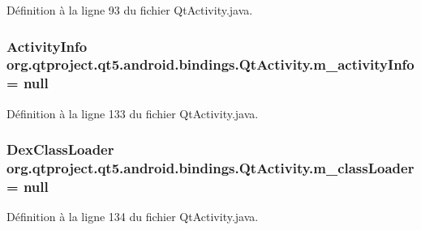 Définition à la ligne 93 du fichier Qt\-Activity.\-java.

\hypertarget{classorg_1_1qtproject_1_1qt5_1_1android_1_1bindings_1_1_qt_activity_ab82e3c0917844afbd0559863f78137bf}{
\subsubsection[{m\-\_\-activity\-Info}]{\setlength{\rightskip}{0pt plus 5cm}Activity\-Info org.\-qtproject.\-qt5.\-android.\-bindings.\-Qt\-Activity.\-m\-\_\-activity\-Info = null\hspace{0.3cm}{\ttfamily [private]}}}\label{classorg_1_1qtproject_1_1qt5_1_1android_1_1bindings_1_1_qt_activity_ab82e3c0917844afbd0559863f78137bf}


Définition à la ligne 133 du fichier Qt\-Activity.\-java.

\hypertarget{classorg_1_1qtproject_1_1qt5_1_1android_1_1bindings_1_1_qt_activity_a061ee56178d4d7ab6da01d7cf187e33b}{
\subsubsection[{m\-\_\-class\-Loader}]{\setlength{\rightskip}{0pt plus 5cm}Dex\-Class\-Loader org.\-qtproject.\-qt5.\-android.\-bindings.\-Qt\-Activity.\-m\-\_\-class\-Loader = null\hspace{0.3cm}{\ttfamily [private]}}}\label{classorg_1_1qtproject_1_1qt5_1_1android_1_1bindings_1_1_qt_activity_a061ee56178d4d7ab6da01d7cf187e33b}


Définition à la ligne 134 du fichier Qt\-Activity.\-java.

